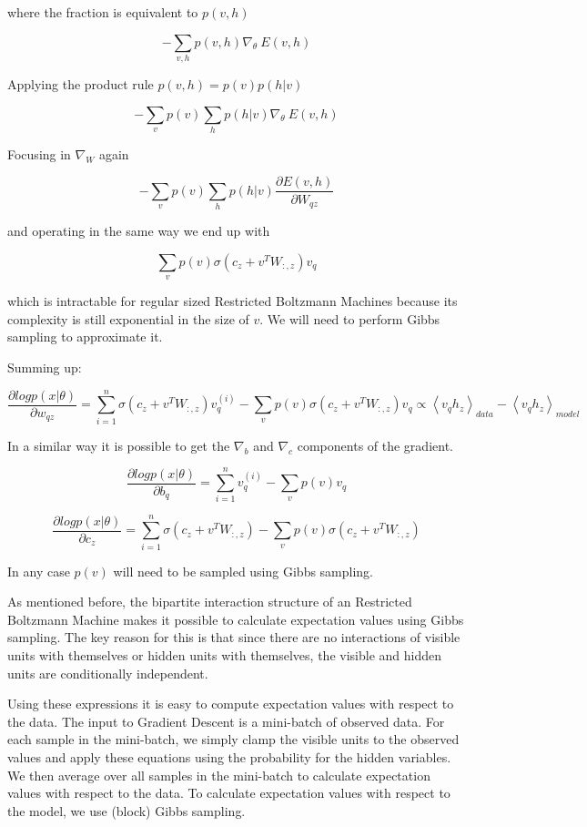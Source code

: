 \noindent where the fraction is equivalent to $p(v, h)$

$$ - \sum_{v, h} p(v, h) \nabla_{\theta}~  E (v, h) $$

\noindent Applying the product rule $p(v,h) = p(v) p(h | v)$

$$ - \sum_{v} p(v) \sum_h p(h | v) \nabla_{\theta}~  E (v, h) $$

\noindent Focusing in $\nabla_W$ again

$$ - \sum_{v} p(v) \sum_h p(h | v) \frac{\partial E (v, h)}{\partial W_{q z}} $$

\noindent and operating in the same way we end up with

$$ \sum_{v} p(v) \sigma (c_z + v^T W_{:, z}) v_q  $$

which is intractable for regular sized Restricted Boltzmann Machines because its complexity is still exponential in the size of $v$. We will need to perform Gibbs sampling to approximate it.

\newpage
\noindent Summing up:

$$ \frac{\partial log p(x | \theta)}{\partial w_{q z}} = \sum_{i=1}^n \sigma (c_z + v^T W_{:, z}) v_q^{(i)} - \sum_{v} p(v) \sigma (c_z + v^T W_{:, z}) v_q \propto  \left< v_q h_z\right>_{data} - \left< v_q h_z\right>_{model}  $$

\noindent In a similar way it is possible to get the $\nabla_b$ and $\nabla_c$ components of the gradient.

$$ \frac{\partial log p(x | \theta)}{\partial b_{q}} = \sum_{i=1}^n v_{q}^{(i)} - \sum_v p(v) v_q $$

$$ \frac{\partial log p(x | \theta)}{\partial c_{z}} = \sum_{i=1}^n \sigma (c_z + v^T W_{:, z}) - \sum_{v} p(v) \sigma (c_z + v^T W_{:, z}) $$

In any case $p(v)$ will need to be sampled using Gibbs sampling.

\noindent As mentioned before, the bipartite interaction structure of an Restricted Boltzmann Machine makes it possible to calculate expectation values using Gibbs sampling. The key reason for this is that since there are no interactions of visible units with themselves or hidden units with themselves, the visible and hidden units are conditionally independent.

Using these expressions it is easy to compute expectation values with respect to the data. The input to Gradient Descent is a mini-batch of observed data. For each sample in the mini-batch, we simply clamp the visible units to the observed values and apply these equations using the probability for the hidden variables. We then average over all samples in the mini-batch to calculate expectation values with respect to the data. To calculate expectation values with respect to the model, we use (block) Gibbs sampling.

